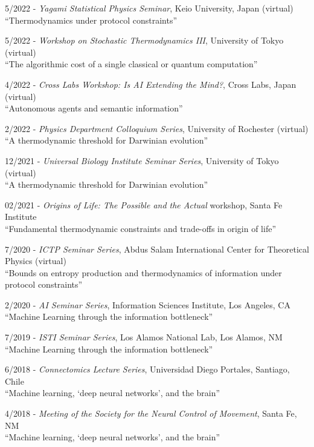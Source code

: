 \documentclass[margin,line,centered]{res}
\begin{document}
\begin{resume}
5/2022 - \emph{Yagami Statistical Physics Seminar}, Keio University, Japan (virtual)\\
``Thermodynamics under protocol constraints''

5/2022 - \emph{Workshop on Stochastic Thermodynamics III}, University of Tokyo (virtual)\\
``The algorithmic cost of a single classical or quantum computation'' %

4/2022 - \emph{Cross Labs Workshop: Is AI Extending the Mind?}, Cross Labs, Japan (virtual)\\
``Autonomous agents and semantic information'' %

2/2022 - \emph{Physics Department Colloquium Series}, University of Rochester (virtual)\\
``A thermodynamic threshold for Darwinian evolution'' %

12/2021 - \emph{Universal Biology Institute Seminar Series}, University of Tokyo (virtual)\\
``A thermodynamic threshold for Darwinian evolution'' %

02/2021 - \emph{Origins of Life: The Possible and the Actual} workshop, Santa Fe Institute\\
``Fundamental thermodynamic constraints and trade-offs in origin of life'' %


7/2020 - \emph{ICTP Seminar Series}, Abdus Salam International Center for Theoretical Physics (virtual)\\
``Bounds on entropy production and thermodynamics of information under protocol constraints'' %


2/2020 - \emph{AI Seminar Series}, Information Sciences Institute, Los Angeles, CA\\
``Machine Learning through the information bottleneck'' %

7/2019 - \emph{ISTI Seminar Series}, Los Alamos National Lab, Los Alamos, NM\\
``Machine Learning through the information bottleneck''  %


6/2018 - \emph{Connectomics Lecture Series}, Universidad Diego Portales, Santiago, Chile\\
``Machine learning, `deep neural networks', and the brain''  %

4/2018 - \emph{Meeting of the Society for the Neural Control of Movement}, Santa Fe, NM\\
``Machine learning, `deep neural networks', and the brain''


\end{resume}
\end{document}
